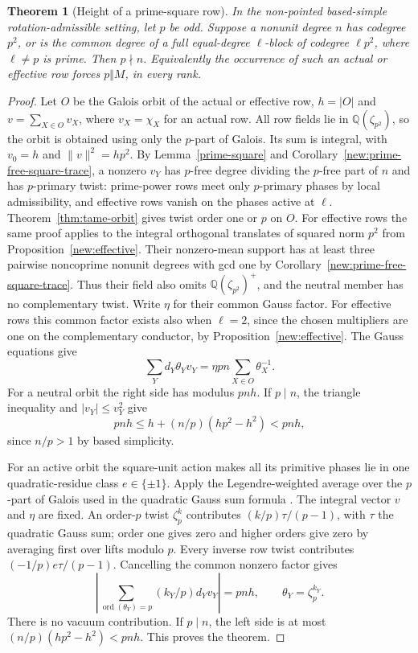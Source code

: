 \documentclass[11pt]{amsart}
\numberwithin{equation}{section}
\newtheorem{theorem}{Theorem}[section]
\theoremstyle{definition}
\theoremstyle{plain}
\newcommand{\QQ}{\mathbb Q}
\begin{document}
\begin{theorem}[Height of a prime-square row]\label{new:prime-square-height}\label{rev:height}
In the non-pointed based-simple rotation-admissible setting, let $p$ be odd. Suppose a nonunit degree $n$ has codegree $p^2$, or is
the common degree of a full equal-degree $\ell$-block of codegree
$\ell p^2$, where $\ell\ne p$ is prime. Then $p\nmid n$.
Equivalently the occurrence of such an actual or effective row forces
$p\Vert M$, in every rank.
\end{theorem}
\begin{proof}
Let $O$ be the Galois orbit of the actual or effective row, $h=|O|$
and $v=\sum_{X\in O}v_X$, where $v_X=\chi_X$ for an actual row.
All row fields lie in $\QQ(\zeta_{p^2})$, so the orbit is obtained
using only the $p$-part of Galois. Its sum is integral, with
$v_0=h$ and $\|v\|^2=hp^2$. By Lemma~\ref{prime-square} and
Corollary~\ref{new:prime-free-square-trace}, a nonzero $v_Y$ has
$p$-free degree dividing the $p$-free part of $n$ and has $p$-primary
twist: prime-power rows meet only $p$-primary phases by local admissibility,
and effective rows vanish on the phases active at $\ell$.
Theorem~\ref{thm:tame-orbit} gives twist order one or $p$ on $O$.
For effective rows the same proof applies to the integral orthogonal
translates of squared norm $p^2$ from Proposition~\ref{new:effective}.
Their nonzero-mean support has at least three pairwise noncoprime
nonunit degrees with gcd one by Corollary~\ref{new:prime-free-square-trace}.
Thus their field also omits $\QQ(\zeta_{p^2})^+$, and the neutral
member has no complementary twist. Write $\eta$ for their common Gauss
factor. For effective rows this common factor exists also when
$\ell=2$, since the chosen multipliers are one on the complementary
conductor, by Proposition~\ref{new:effective}. The Gauss equations give
\[
  \sum_Y d_Y\theta_Y v_Y=\eta pn\sum_{X\in O}\theta_X^{-1}.
\]
For a neutral orbit the right side has modulus $pnh$. If $p\mid n$,
the triangle inequality and $|v_Y|\le v_Y^2$ give
\[
  pnh\le h+(n/p)(hp^2-h^2)<pnh,
\]
since $n/p>1$ by based simplicity.

For an active orbit the square-unit action makes all its primitive
phases lie in one quadratic-residue class $e\in\{\pm1\}$. Apply
the Legendre-weighted average over the $p$-part of Galois used in
the quadratic Gauss sum formula \cite[Ch.~6]{Washington}. The integral vector $v$ and
$\eta$ are fixed. An order-$p$ twist $\zeta_p^k$ contributes
$(k/p)\tau/(p-1)$, with $\tau$ the quadratic Gauss sum; order one
gives zero and higher orders give zero by averaging first over
lifts modulo $p$. Every inverse row twist contributes
$(-1/p)e\tau/(p-1)$. Cancelling the common nonzero factor gives
\[
 \left|\sum_{\operatorname{ord}(\theta_Y)=p}
               (k_Y/p)d_Y v_Y\right|=pnh,
 \qquad \theta_Y=\zeta_p^{k_Y}.
\]
There is no vacuum contribution. If $p\mid n$, the left side is at
most $(n/p)(hp^2-h^2)<pnh$. This proves the theorem.
\end{proof}
\end{document}
